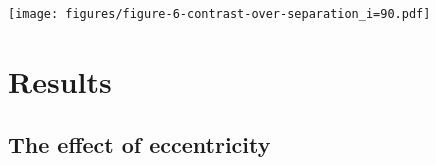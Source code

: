 \documentclass[
    usenatbib,
]{mnras}
\newcommand{\todo}[1]{\textcolor{red}{[#1]}}
\newcommand{\timmy}[1]{\textcolor{red}{[\textbf{Timmy:} #1]}} %
\newcommand{\IWA}{\ensuremath{\mathrm{IWA}}}
\newcommand{\hwo}{HabWorlds}
\begin{document}
\begin{figure*}
   \centering
    \texttt{[image: figures/figure-6-contrast-over-separation\_i=90.pdf]}
    \caption{
        The contrast (Eq.~\ref{eq:contrast}) and orbital separation 
        of an Earth-like planet with an ocean surface and patchy clouds 
        along its orbit with an assumed inclination angle $i$ of \qty{90}{\degree} around $\alpha$~Cen~A, $\epsilon$~Eri, and Lalande~21185.
        The solid, black line indicates the contrast in unpolarized light, 
        with the contrast at quadrature marked by the black dot.
        The polarized component is indicated by the coloured dots, with the colour representing the phase angle from quadrature.
        The light grey dots show the contrasts at quadrature of the other targets in the star list, and the dashed lines indicate $1$, $2$ and $3$ times the \IWA{} for \hwo.
    }
    \label{fig:contrasts}
\end{figure*}

\section{Results}
\label{sec:3}



\subsection{The effect of eccentricity}
\label{sec:result_eccentricity}
\end{document}
